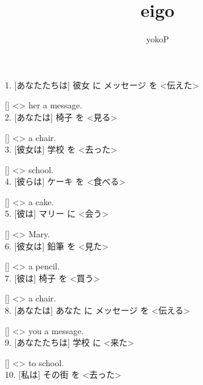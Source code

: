\documentclass[uplatex,
paper=a4,
fontsize=18pt,
jafontsize=16pt,
number_of_lines=30,
line_length=30zh,
baselineskip=25pt,
]{jlreq}
\author{yokoP}
\title{eigo}
\begin{document}
1.  [あなたたちは] 彼女 に メッセージ を <伝えた>

  [\hspace{3em}] <\hspace{3em}> her a message.
\\

2.  [あなたは] 椅子 を <見る>

  [\hspace{3em}] <\hspace{3em}> a chair.
\\

3.  [彼女は] 学校 を <去った>

  [\hspace{3em}] <\hspace{3em}> school.
\\

4.  [彼らは] ケーキ を <食べる>

  [\hspace{3em}] <\hspace{3em}> a cake.
\\

5.  [彼は] マリー に <会う>

  [\hspace{3em}] <\hspace{3em}> Mary.
\\

6.  [彼女は] 鉛筆 を <見た>

  [\hspace{3em}] <\hspace{3em}> a pencil.
\\

7.  [彼は] 椅子 を <買う>

  [\hspace{3em}] <\hspace{3em}> a chair.
\\

8.  [あなたは] あなた に メッセージ を <伝える>

  [\hspace{3em}] <\hspace{3em}> you a message.
\\

9.  [あなたたちは] 学校 に <来た>

  [\hspace{3em}] <\hspace{3em}> to school.
\\

10.  [私は] その街 を <去った>
\end{document}
